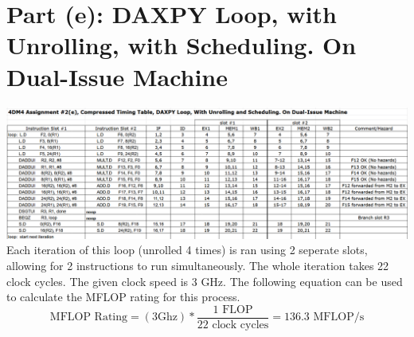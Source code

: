 \documentclass[12pt, letterpaper, titlepage, hidelinks]{article}
\begin{document}
\section{Part (e): DAXPY Loop, with Unrolling, with Scheduling. On  Dual-Issue Machine}
	\includegraphics[width=\textwidth]{2e}
	Each iteration of this loop (unrolled 4 times) is ran using 2 seperate slots, allowing for 2 instructions to run simultaneously. The whole iteration takes 22 clock cycles. The given clock speed is 3 GHz. The following equation can be used to calculate the MFLOP rating for this process.
	\begin{equation}
		\text{MFLOP Rating} = (3 \text{{Ghz}}) * \frac{1 \text{ FLOP}}{22 \text{ clock cycles}} = 136.3 \text{ MFLOP/s}
	\end{equation}
\end{document}
